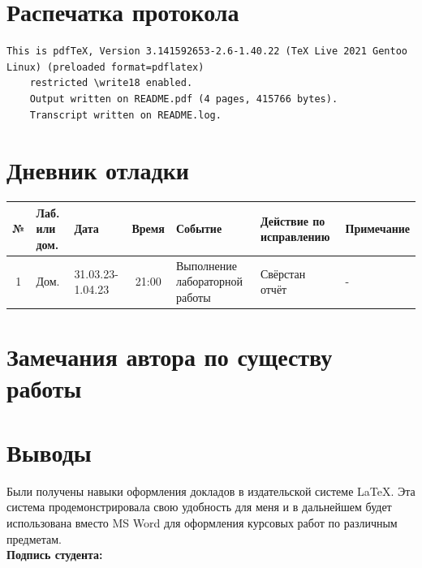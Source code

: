 \documentclass[12pt, letterpaper]{article}
\begin{document}
\section{Распечатка протокола}
\begin{lstlisting}[breaklines]
    This is pdfTeX, Version 3.141592653-2.6-1.40.22 (TeX Live 2021 Gentoo Linux) (preloaded format=pdflatex)
    restricted \write18 enabled.
    Output written on README.pdf (4 pages, 415766 bytes).
    Transcript written on README.log.
\end{lstlisting}  
\section{Дневник отладки}
\begin{tabular}{|c|p{1cm}|p{1.5cm}|c|p{2.5cm}|p{2cm}|p{2.25cm}|}
    \hline
    № & Лаб. или дом. & Дата & Время & Событие & Действие по исправлению & Примечание\\
    \hline
    1 & Дом. & 31.03.23-1.04.23 & 21:00 & Выполнение лабораторной работы & Свёрстан отчёт & -\\
    \hline
\end{tabular}
\section{Замечания автора по существу работы}
\section{Выводы}
\enlargethispage{-1\baselineskip}
Были получены навыки оформления докладов в издательской системе \LaTeX{}. Эта система продемонстрировала свою удобность для меня и в дальнейшем будет использована вместо MS Word для оформления курсовых работ по различным предметам. \\
\flushright \textbf{Подпись студента:} \underline{\hspace{3cm}}
\end{document}
